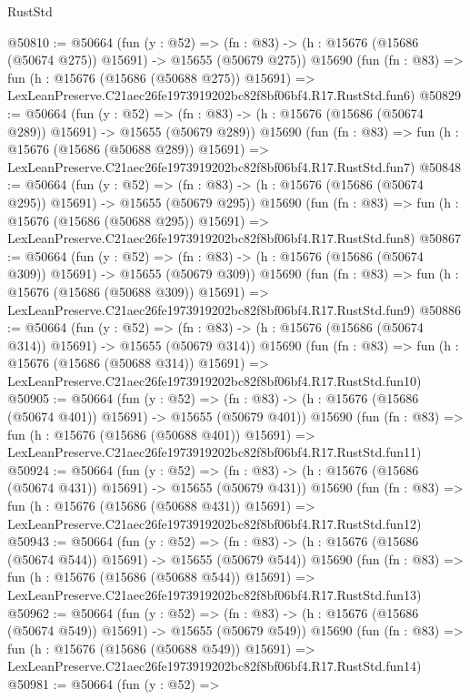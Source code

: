 \begin{lexlean}{RustStd}
\begin{coremodule}
@50810 := @50664
    (fun (y : @52) =>
    (fn : @83) -> (h : @15676 (@15686 (@50674 @275)) @15691) -> @15655 (@50679 @275))
    @15690
    (fun (fn : @83) =>
    fun (h : @15676 (@15686 (@50688 @275)) @15691) =>
    LexLeanPreserve.C21aec26fe1973919202bc82f8bf06bf4.R17.RustStd.fun6)
@50829 := @50664
    (fun (y : @52) =>
    (fn : @83) -> (h : @15676 (@15686 (@50674 @289)) @15691) -> @15655 (@50679 @289))
    @15690
    (fun (fn : @83) =>
    fun (h : @15676 (@15686 (@50688 @289)) @15691) =>
    LexLeanPreserve.C21aec26fe1973919202bc82f8bf06bf4.R17.RustStd.fun7)
@50848 := @50664
    (fun (y : @52) =>
    (fn : @83) -> (h : @15676 (@15686 (@50674 @295)) @15691) -> @15655 (@50679 @295))
    @15690
    (fun (fn : @83) =>
    fun (h : @15676 (@15686 (@50688 @295)) @15691) =>
    LexLeanPreserve.C21aec26fe1973919202bc82f8bf06bf4.R17.RustStd.fun8)
@50867 := @50664
    (fun (y : @52) =>
    (fn : @83) -> (h : @15676 (@15686 (@50674 @309)) @15691) -> @15655 (@50679 @309))
    @15690
    (fun (fn : @83) =>
    fun (h : @15676 (@15686 (@50688 @309)) @15691) =>
    LexLeanPreserve.C21aec26fe1973919202bc82f8bf06bf4.R17.RustStd.fun9)
@50886 := @50664
    (fun (y : @52) =>
    (fn : @83) -> (h : @15676 (@15686 (@50674 @314)) @15691) -> @15655 (@50679 @314))
    @15690
    (fun (fn : @83) =>
    fun (h : @15676 (@15686 (@50688 @314)) @15691) =>
    LexLeanPreserve.C21aec26fe1973919202bc82f8bf06bf4.R17.RustStd.fun10)
@50905 := @50664
    (fun (y : @52) =>
    (fn : @83) -> (h : @15676 (@15686 (@50674 @401)) @15691) -> @15655 (@50679 @401))
    @15690
    (fun (fn : @83) =>
    fun (h : @15676 (@15686 (@50688 @401)) @15691) =>
    LexLeanPreserve.C21aec26fe1973919202bc82f8bf06bf4.R17.RustStd.fun11)
@50924 := @50664
    (fun (y : @52) =>
    (fn : @83) -> (h : @15676 (@15686 (@50674 @431)) @15691) -> @15655 (@50679 @431))
    @15690
    (fun (fn : @83) =>
    fun (h : @15676 (@15686 (@50688 @431)) @15691) =>
    LexLeanPreserve.C21aec26fe1973919202bc82f8bf06bf4.R17.RustStd.fun12)
@50943 := @50664
    (fun (y : @52) =>
    (fn : @83) -> (h : @15676 (@15686 (@50674 @544)) @15691) -> @15655 (@50679 @544))
    @15690
    (fun (fn : @83) =>
    fun (h : @15676 (@15686 (@50688 @544)) @15691) =>
    LexLeanPreserve.C21aec26fe1973919202bc82f8bf06bf4.R17.RustStd.fun13)
@50962 := @50664
    (fun (y : @52) =>
    (fn : @83) -> (h : @15676 (@15686 (@50674 @549)) @15691) -> @15655 (@50679 @549))
    @15690
    (fun (fn : @83) =>
    fun (h : @15676 (@15686 (@50688 @549)) @15691) =>
    LexLeanPreserve.C21aec26fe1973919202bc82f8bf06bf4.R17.RustStd.fun14)
@50981 := @50664
    (fun (y : @52) =>

\end{coremodule}
\end{lexlean}
